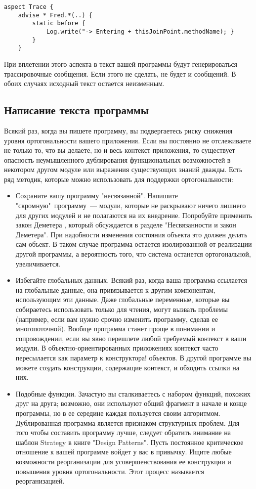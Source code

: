 \begin{verbatim}
aspect Trace { 
	advise * Fred.*(..) { 
		static before { 
			Log.write("-> Entering + thisJoinPoint.methodName); }
		}
	}
\end{verbatim}

При вплетении этого аспекта в текст вашей программы будут генерироваться
трассировочные сообщения. Если этого не сделать, не будет и сообщений. В обоих
случаях исходный текст остается неизменным.

\subsection{Написание текста программы}

Всякий раз, когда вы пишете программу, вы подвергаетесь риску снижения уровня
ортогональности вашего приложения. Если вы постоянно не отслеживаете не только
то, что вы делаете, но и весь контекст приложения, то существует опасность
неумышленного дублирования функциональных возможностей в некотором другом модуле
или выражения существующих знаний дважды. Есть ряд методик, которые можно
использовать для поддержки ортогональности:

\begin{itemize}
  \item 
Сохраните вашу программу "несвязанной". Напишите "скромную"\ программу\
--- модули, которые не раскрывают ничего лишнего для других модулей и не
полагаются на их внедрение. Попробуйте применить закон Деметера , который
обсуждается в разделе "Несвязанности и закон Деметера". При надобности изменения
состояния объекта это должен делать сам объект. В таком случае программа
остается изолированной от реализации другой программы, а вероятность того, что
система останется ортогональной, увеличивается.

  \item 
Избегайте глобальных данных. Всякий раз, когда ваша программа ссылается на
глобальные данные, она привязывается к другим компонентам, использующим эти
данные. Даже глобальные переменные, которые вы собираетесь использовать только
для чтения, могут вызвать проблемы (например, если вам нужно срочно изменить
программу, сделав ее многопоточной). Вообще программа станет проще в понимании и
сопровождении, если вы явно перешлете любой требуемый контекст в ваши модули. В
объектно-ориентированных приложениях контекст часто пересылается как параметр к
конструктора! объектов. В другой программе вы можете создать конструкции,
содержащие контекст, и обходить ссылки на них.

  \item 
Подобные функции. Зачастую вы сталкиваетесь с набором функций, похожих друг на
друга; возможно, они используют общий фрагмент в начале и конце программы, но в
ее середине каждая пользуется своим алгоритмом. Дублированная программа является
признаком структурных проблем. Для того чтобы составить программу лучше, следует
обратить внимание на шаблон Strategy в книге "Design Patterns".
Пусть постоянное критическое отношение к вашей программе войдет у вас в
привычку. Ищите любые возможности реорганизации для усовершенствования ее
конструкции и повышения уровня ортогональности. Этот процесс называется
реорганизацией.
\end{itemize}

